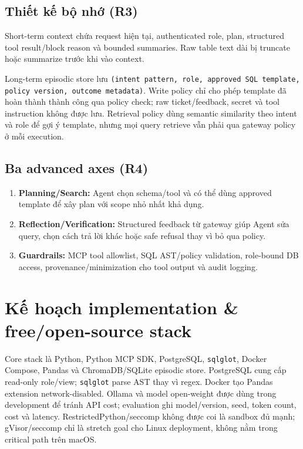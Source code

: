 \subsection{Thiết kế bộ nhớ (R3)}

Short-term context chứa request hiện tại, authenticated role, plan, structured tool result/block reason và bounded summaries. Raw table text dài bị truncate hoặc summarize trước khi vào context.

Long-term episodic store lưu \texttt{(intent pattern, role, approved SQL template, policy version, outcome metadata)}. Write policy chỉ cho phép template đã hoàn thành thành công qua policy check; raw ticket/feedback, secret và tool instruction không được lưu. Retrieval policy dùng semantic similarity theo intent và role để gợi ý template, nhưng mọi query retrieve vẫn phải qua gateway policy ở mỗi execution.

\subsection{Ba advanced axes (R4)}

\begin{enumerate}
    \item \textbf{Planning/Search:} Agent chọn schema/tool và có thể dùng approved template để xây plan với scope nhỏ nhất khả dụng.
    \item \textbf{Reflection/Verification:} Structured feedback từ gateway giúp Agent sửa query, chọn cách trả lời khác hoặc safe refusal thay vì bỏ qua policy.
    \item \textbf{Guardrails:} MCP tool allowlist, SQL AST/policy validation, role-bound DB access, provenance/minimization cho tool output và audit logging.
\end{enumerate}

\section{Kế hoạch implementation \& free/open-source stack}

Core stack là Python, Python MCP SDK, PostgreSQL, \texttt{sqlglot}, Docker Compose, Pandas và ChromaDB/SQLite episodic store. PostgreSQL cung cấp read-only role/view; \texttt{sqlglot} parse AST thay vì regex. Docker tạo Pandas extension network-disabled. Ollama và model open-weight được dùng trong development để tránh API cost; evaluation ghi model/version, seed, token count, cost và latency. RestrictedPython/seccomp không được coi là sandbox đủ mạnh; gVisor/seccomp chỉ là stretch goal cho Linux deployment, không nằm trong critical path trên macOS.

